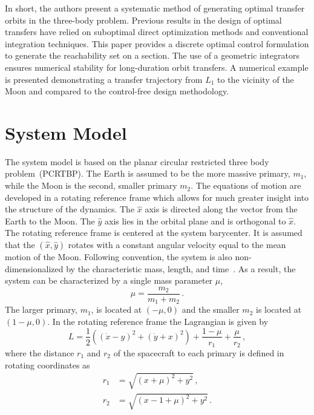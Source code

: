 In short, the authors present a systematic method of generating optimal transfer orbits in the three-body problem.
Previous results in the design of optimal transfers have relied on suboptimal direct optimization methods and conventional integration techniques.
This paper provides a discrete optimal control formulation to generate the reachability set on a \Poincare section.
The use of a geometric integrators ensures numerical stability for long-duration orbit transfers.
A numerical example is presented demonstrating a transfer trajectory from \( L_1 \) to the vicinity of the Moon and compared to the control-free design methodology.
\section{System Model}\label{sec:pcrtbp}
The system model is based on the planar circular restricted three body problem~(PCRTBP).
The Earth is assumed to be the more massive primary, \( m_1 \), while the Moon is the second, smaller primary \( m_2\).
The equations of motion are developed in a rotating reference frame which allows for much greater insight into the structure of the dynamics.
The \( \hat{x} \) axis is directed along the vector from the Earth to the Moon.
The \( \hat{y} \) axis lies in the orbital plane and is orthogonal to \( \hat{x} \).
The rotating reference frame is centered at the system barycenter.
It is assumed that the \(\left( \hat{x}, \hat{y}\right)\) rotates with a constant angular velocity equal to the mean motion of the Moon.
Following convention, the system is also non-dimensionalized by the characteristic mass, length, and time~\cite{koon2000}.
As a result, the system can be characterized by a single mass parameter \( \mu \),
\begin{equation}
	\mu = \frac{m_2}{m_1+m_2} \, .
	\label{eq:mass_param}
\end{equation}
The larger primary, \(m_1\), is located at \( \left(  -\mu , 0 \right)\) and the smaller \( m_2\) is located at \( \left( 1-\mu , 0 \right)\).
In the rotating reference frame the Lagrangian is given by
\begin{equation}
	L = \frac{1}{2} \left( \left( \dot{x} -y \right)^2 + \left( \dot{y} + x \right)^2 \right) + \frac{1-\mu}{r_1} + \frac{\mu}{r_2}\, ,
	\label{eq:lagrangian}
\end{equation}
where the distance \(r_1\) and \(r_2\) of the spacecraft to each primary is defined in rotating coordinates as
\begin{align}
	r_1 &= \sqrt{\left( x + \mu\right)^2 + y^2}\, , \\
	r_2 &= \sqrt{\left( x - 1 + \mu\right)^2 + y^2}\, .
	\label{eq:distances}
\end{align}
